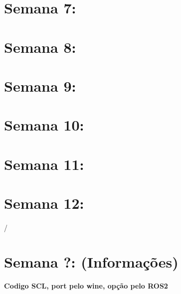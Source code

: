 \documentclass{article}
\begin{document}
\paragraph{}

\newpage
\section{Semana 7:}
\paragraph{}

\newpage
\section{Semana 8:}
\paragraph{}

\newpage
\section{Semana 9:}
\paragraph{}

\newpage
\section{Semana 10:}
\paragraph{}

\newpage
\section{Semana 11:}
\paragraph{}

\newpage
\section{Semana 12:}
\paragraph{}/

\newpage
\section{Semana ?: (Informações)}
\paragraph{Codigo SCL, port pelo wine, opção pelo ROS2}
\end{document}
